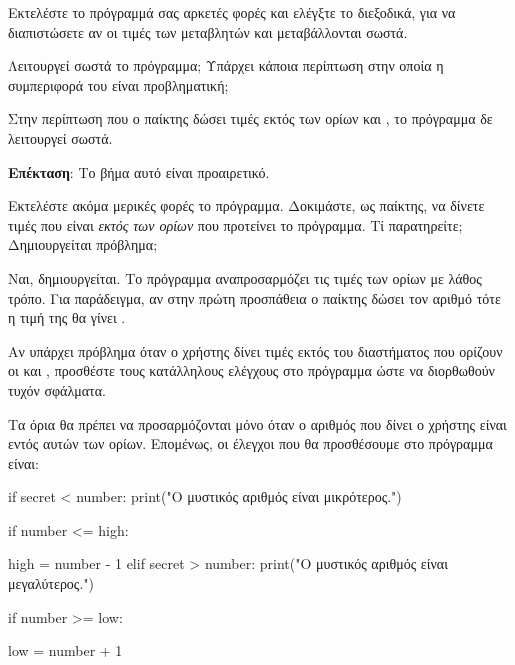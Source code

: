 \documentclass[a4paper,11pt,oneside]{book}
\begin{document}
\begin{step}
Εκτελέστε το πρόγραμμά σας αρκετές φορές και ελέγξτε το διεξοδικά, για να διαπιστώσετε αν οι τιμές των μεταβλητών  και  μεταβάλλονται σωστά.

Λειτουργεί σωστά το πρόγραμμα; Υπάρχει κάποια περίπτωση στην οποία η συμπεριφορά του είναι προβληματική; 

\begin{answer}
	Στην περίπτωση που ο παίκτης δώσει τιμές εκτός των ορίων  και , το πρόγραμμα δε λειτουργεί σωστά.
\end{answer}
\end{step}

\begin{step}
\begin{note}
\textbf{Επέκταση}: Το βήμα αυτό είναι προαιρετικό. 
\end{note}

Εκτελέστε ακόμα μερικές φορές το πρόγραμμα. Δοκιμάστε, ως παίκτης, να δίνετε τιμές που είναι \emph{εκτός των ορίων} που προτείνει το πρόγραμμα. Τί παρατηρείτε; Δημιουργείται πρόβλημα;

\begin{answer}
	Ναι, δημιουργείται. Το πρόγραμμα αναπροσαρμόζει τις τιμές των ορίων με λάθος τρόπο. Για παράδειγμα, αν στην πρώτη προσπάθεια ο παίκτης δώσει τον αριθμό  τότε η τιμή της  θα γίνει .
\end{answer}

Αν υπάρχει πρόβλημα όταν ο χρήστης δίνει τιμές εκτός του διαστήματος που ορίζουν οι  και , προσθέστε τους κατάλληλους ελέγχους στο πρόγραμμα ώστε να διορθωθούν τυχόν σφάλματα.

\begin{answer}
Τα όρια θα πρέπει να προσαρμόζονται μόνο όταν ο αριθμός  που δίνει ο χρήστης είναι εντός αυτών των ορίων. Επομένως, οι έλεγχοι που θα προσθέσουμε στο πρόγραμμα είναι:
	
\begin{pyplain}	
if secret < number:
    print("Ο μυστικός αριθμός είναι μικρότερος.")	   
\end{pyplain}
\begin{pynew}
    if number <= high:
\end{pynew}
\begin{pyplain}
        high = number - 1    
elif secret > number:
    print("Ο μυστικός αριθμός είναι μεγαλύτερος.") 	    
\end{pyplain}
\begin{pynew}
    if number >= low:
\end{pynew}
\begin{pyplain}
        low = number + 1
\end{pyplain}
\end{answer}
\end{step}
\end{document}
